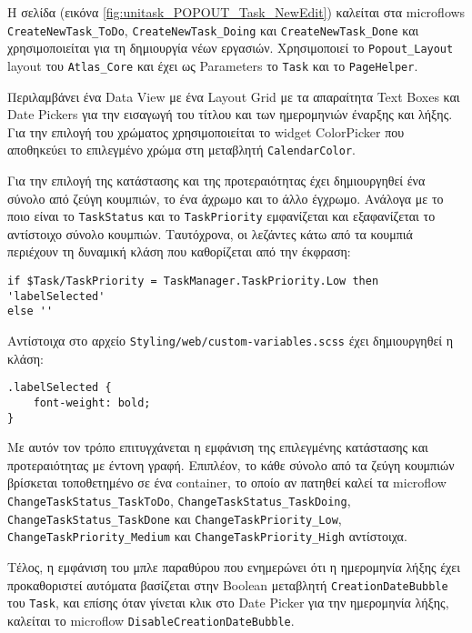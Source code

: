                 Η σελίδα (εικόνα \ref{fig:unitask_POPOUT_Task_NewEdit}) καλείται στα microflows \texttt{CreateNewTask\_ToDo}, \texttt{CreateNewTask\_Doing} και \texttt{CreateNewTask\_Done} και χρησιμοποιείται για τη δημιουργία νέων εργασιών. Χρησιμοποιεί το \texttt{Popout\_Layout} layout του \texttt{Atlas\_Core} και έχει ως Parameters το \texttt{Task} και το \texttt{PageHelper}.

                Περιλαμβάνει ένα Data View με ένα Layout Grid με τα απαραίτητα Text Boxes και Date Pickers για την εισαγωγή του τίτλου και των ημερομηνιών έναρξης και λήξης. Για την επιλογή του χρώματος χρησιμοποιείται το widget ColorPicker που αποθηκεύει το επιλεγμένο χρώμα στη μεταβλητή \texttt{CalendarColor}.

                Για την επιλογή της κατάστασης και της προτεραιότητας έχει δημιουργηθεί ένα σύνολο από ζεύγη κουμπιών, το ένα άχρωμο και το άλλο έγχρωμο. Ανάλογα με το ποιο είναι το \texttt{TaskStatus} και το \texttt{TaskPriority} εμφανίζεται και εξαφανίζεται το αντίστοιχο σύνολο κουμπιών. Ταυτόχρονα, οι λεζάντες κάτω από τα κουμπιά περιέχουν τη δυναμική κλάση που καθορίζεται από την έκφραση:

                \begin{lstlisting}[mystyle]
if $Task/TaskPriority = TaskManager.TaskPriority.Low then 'labelSelected'
else ''         \end{lstlisting}

Αντίστοιχα στο αρχείο \verb|Styling/web/custom-variables.scss| έχει δημιουργηθεί η κλάση:
                \begin{lstlisting}[mystyle]
.labelSelected {
    font-weight: bold;
}                \end{lstlisting}

                Με αυτόν τον τρόπο επιτυγχάνεται η εμφάνιση της επιλεγμένης κατάστασης και προτεραιότητας με έντονη γραφή. Επιπλέον, το κάθε σύνολο από τα ζεύγη κουμπιών βρίσκεται τοποθετημένο σε ένα container, το οποίο αν πατηθεί καλεί τα microflow \texttt{ChangeTaskStatus\_TaskToDo}, \texttt{ChangeTaskStatus\_TaskDoing}, \texttt{ChangeTaskStatus\_}\linebreak\texttt{TaskDone} και \texttt{ChangeTaskPriority\_Low}, \texttt{ChangeTaskPriority\_Medium} και \linebreak \texttt{ChangeTaskPriority\_High} αντίστοιχα.

                Τέλος, η εμφάνιση του μπλε παραθύρου που ενημερώνει ότι η ημερομηνία λήξης έχει προκαθοριστεί αυτόματα βασίζεται στην Boolean μεταβλητή \texttt{CreationDateBubble} του \texttt{Task}, και επίσης όταν γίνεται κλικ στο Date Picker για την ημερομηνία λήξης, καλείται το microflow  \texttt{DisableCreationDateBubble}.

